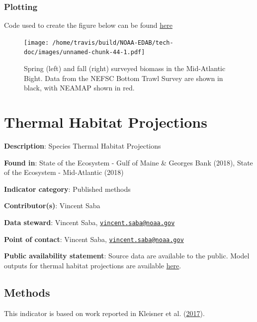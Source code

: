 \documentclass[
]{book}
\begin{document}
\hypertarget{plotting-34}{%
\subsection{Plotting}\label{plotting-34}}

Code used to create the figure below can be found \href{https://github.com/NOAA-EDAB/ecodata/blob/master/chunk-scripts/macrofauna.Rmd-agg-bio.R}{here}

\begin{figure}
\centering
\texttt{[image: /home/travis/build/NOAA-EDAB/tech-doc/images/unnamed-chunk-44-1.pdf]}
\caption{\label{fig:unnamed-chunk-44}Spring (left) and fall (right) surveyed biomass in the Mid-Atlantic Bight. Data from the NEFSC Bottom Trawl Survey are shown in black, with NEAMAP shown in red.}
\end{figure}

\hypertarget{thermal-habitat-projections}{%
\chapter{Thermal Habitat Projections}\label{thermal-habitat-projections}}

\textbf{Description}: Species Thermal Habitat Projections

\textbf{Found in}: State of the Ecosystem - Gulf of Maine \& Georges Bank (2018), State of the Ecosystem - Mid-Atlantic (2018)

\textbf{Indicator category}: Published methods

\textbf{Contributor(s)}: Vincent Saba

\textbf{Data steward}: Vincent Saba, \href{mailto:vincent.saba@noaa.gov}{\nolinkurl{vincent.saba@noaa.gov}}

\textbf{Point of contact}: Vincent Saba, \href{mailto:vincent.saba@noaa.gov}{\nolinkurl{vincent.saba@noaa.gov}}

\textbf{Public availability statement}: Source data are available to the public. Model outputs for thermal habitat projections are available \href{https://comet.nefsc.noaa.gov/erddap/info/index.html?page=1\&itemsPerPage=1000}{here}.

\hypertarget{methods-41}{%
\section{Methods}\label{methods-41}}

This indicator is based on work reported in Kleisner et al. (\protect\hyperlink{ref-Kleisner2017}{2017}).
\end{document}
